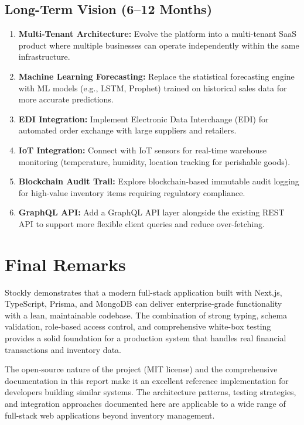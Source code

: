 \documentclass[12pt,a4paper]{report}
\begin{document}
\subsection{Long-Term Vision (6--12 Months)}

\begin{enumerate}[leftmargin=1.5em]
  \item \textbf{Multi-Tenant Architecture:} Evolve the platform into a multi-tenant SaaS product where multiple businesses can operate independently within the same infrastructure.
  \item \textbf{Machine Learning Forecasting:} Replace the statistical forecasting engine with ML models (e.g., LSTM, Prophet) trained on historical sales data for more accurate predictions.
  \item \textbf{EDI Integration:} Implement Electronic Data Interchange (EDI) for automated order exchange with large suppliers and retailers.
  \item \textbf{IoT Integration:} Connect with IoT sensors for real-time warehouse monitoring (temperature, humidity, location tracking for perishable goods).
  \item \textbf{Blockchain Audit Trail:} Explore blockchain-based immutable audit logging for high-value inventory items requiring regulatory compliance.
  \item \textbf{GraphQL API:} Add a GraphQL API layer alongside the existing REST API to support more flexible client queries and reduce over-fetching.
\end{enumerate}

\section{Final Remarks}

Stockly demonstrates that a modern full-stack application built with Next.js, TypeScript, Prisma, and MongoDB can deliver enterprise-grade functionality with a lean, maintainable codebase. The combination of strong typing, schema validation, role-based access control, and comprehensive white-box testing provides a solid foundation for a production system that handles real financial transactions and inventory data.

The open-source nature of the project (MIT license) and the comprehensive documentation in this report make it an excellent reference implementation for developers building similar systems. The architecture patterns, testing strategies, and integration approaches documented here are applicable to a wide range of full-stack web applications beyond inventory management.
\end{document}
